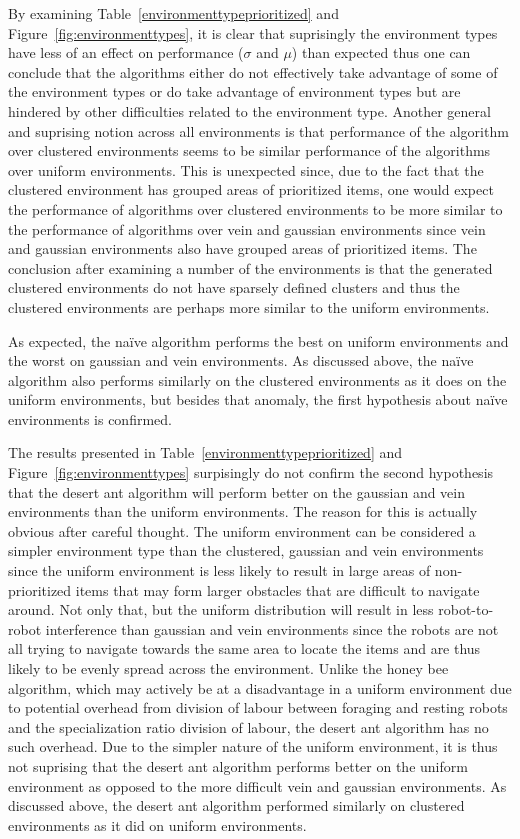 By examining Table~\ref{environmenttypeprioritized} and Figure~\ref{fig:environmenttypes}, it is clear that suprisingly the environment types have less of an effect on performance ($\sigma$ and $\mu$) than expected thus one can conclude that the algorithms either do not effectively take advantage of some of the environment types or do take advantage of environment types but are hindered by other difficulties related to the environment type. Another general and suprising notion across all environments is that performance of the algorithm over clustered environments seems to be similar performance of the algorithms over uniform environments. This is unexpected since, due to the fact that the clustered environment has grouped areas of prioritized items, one would expect the performance of algorithms over clustered environments to be more similar to the performance of algorithms over vein and gaussian environments since vein and gaussian environments also have grouped areas of prioritized items. The conclusion after examining a number of the environments is that the generated clustered environments do not have sparsely defined clusters and thus the clustered environments are perhaps more similar to the uniform environments. 

As expected, the na\"ive algorithm performs the best on uniform environments and the worst on gaussian and vein environments. As discussed above, the na\"ive algorithm also performs similarly on the clustered environments as it does on the uniform environments, but besides that anomaly, the first hypothesis about na\"ive environments is confirmed. 

The results presented in Table~\ref{environmenttypeprioritized} and Figure~\ref{fig:environmenttypes} surpisingly do not confirm the second hypothesis that the desert ant algorithm will perform better on the gaussian and vein environments than the uniform environments. The reason for this is actually obvious after careful thought. The uniform environment can be considered a simpler environment type than the  clustered, gaussian and vein environments since the uniform environment is less likely to result in large areas of non-prioritized items that may form larger obstacles that are difficult to navigate around. Not only that, but the uniform distribution will result in less robot-to-robot interference than gaussian and vein environments since the robots are not all trying to navigate towards the same area to locate the items and are thus likely to be evenly spread across the environment. Unlike the honey bee algorithm, which may actively be at a disadvantage in a uniform environment due to potential overhead from division of labour between foraging and resting robots and the specialization ratio division of labour, the desert ant algorithm has no such overhead. Due to the simpler nature of the uniform environment, it is thus not suprising that the desert ant algorithm performs better on the uniform environment as opposed to the more difficult vein and gaussian environments. As discussed above, the desert ant algorithm performed similarly on clustered environments as it did on uniform environments. 


